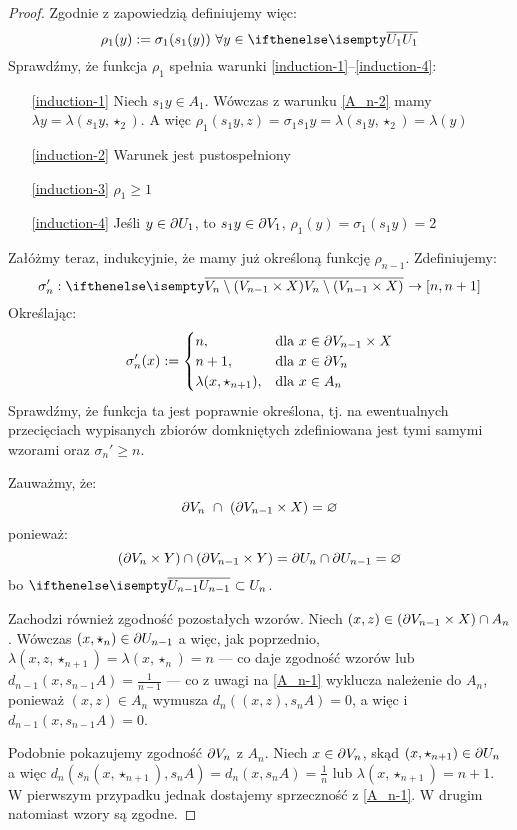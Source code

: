 \begin{thm}
\begin{proof}
  Zgodnie z zapowiedzią definiujemy więc:
  \[
    \rho_1(y) := \sigma_1(s_1(y))\ \forall y \in \cl{U_1}
  \]
  Sprawdźmy, że funkcja $\rho_1$ spełnia warunki \ref{induction-1}--\ref{induction-4}:
  \begin{enumerate}
   \item[\ref{induction-1}] Niech $s_1 y \in A_1$. Wówczas z warunku \ref{A_n-2} mamy $\lambda y = \lambda(s_1 y,\star_{2})$. A więc $\rho_1(s_1 y,z) = \sigma_1 s_1 y = \lambda(s_1 y,\star_2) = \lambda(y)$
   \item[\ref{induction-2}] Warunek jest pustospełniony
   \item[\ref{induction-3}] $\rho_1 \geq 1$
   \item[\ref{induction-4}] Jeśli $y\in\partial U_1$, to $s_1 y\in\partial V_1$, $\rho_1(y) = \sigma_1(s_1 y) = 2$
  \end{enumerate}
  Załóżmy teraz, indukcyjnie, że mamy już określoną funkcję $\rho_{n-1}$. Zdefiniujemy:  
  \[
    \sigma_n': \cl{V_n \setminus (V_{n-1} \times X)} \rightarrow [n,n+1]
  \]
  Określając:
  \[
  \sigma_n'(x) := 
    \begin{cases}
      n,&\mbox{dla }x \in \partial V_{n-1} \times X \\
      n+1,&\mbox{dla }x \in \partial V_n \\
      \lambda(x, \star_{n+1}),&\mbox{dla }x \in A_n
    \end{cases}
  \]
  Sprawdźmy, że funkcja ta jest poprawnie określona, tj. na ewentualnych przecięciach wypisanych zbiorów domkniętych zdefiniowana jest tymi samymi wzorami oraz $\sigma_n' \geq n$.
  
  Zauważmy, że:
  \[
    \partial V_n\ \cap\ (\partial V_{n-1} \times X) = \varnothing
  \]
  ponieważ:
  \[
    (\partial V_n \times Y) \cap (\partial V_{n-1} \times Y) = \partial U_n \cap \partial U_{n-1} = \varnothing
  \]
  bo $\cl{U_{n-1}} \subset U_n$.
  
  Zachodzi również zgodność pozostałych wzorów. Niech $(x, z) \in (\partial V_{n-1} \times X) \cap A_n$. Wówczas $(x, \star_n) \in \partial U_{n-1}$ a więc, jak poprzednio, $\lambda(x, z, \star_{n+1}) = \lambda(x, \star_n) = n$ --- co daje zgodność wzorów lub $d_{n-1}(x, s_{n-1} A) = \frac{1}{n-1}$ --- co z uwagi na \ref{A_n-1} wyklucza należenie do $A_n$, ponieważ $(x, z) \in A_n$ wymusza $d_{n}((x, z), s_{n} A) = 0$, a więc i $d_{n-1}(x, s_{n-1} A) = 0$.
  
  Podobnie pokazujemy zgodność $\partial V_n$ z $A_n$. Niech $x \in \partial V_n$, skąd $(x,\star_{n+1})\in\partial U_n$ a więc $d_n(s_n(x,\star_{n+1}), s_n A) = d_n(x,s_n A) = \frac{1}{n}$ lub $\lambda(x,\star_{n+1}) = n+1$. W pierwszym przypadku jednak dostajemy sprzeczność z \ref{A_n-1}. W drugim natomiast wzory są zgodne.
  

\end{proof}
\end{thm}
